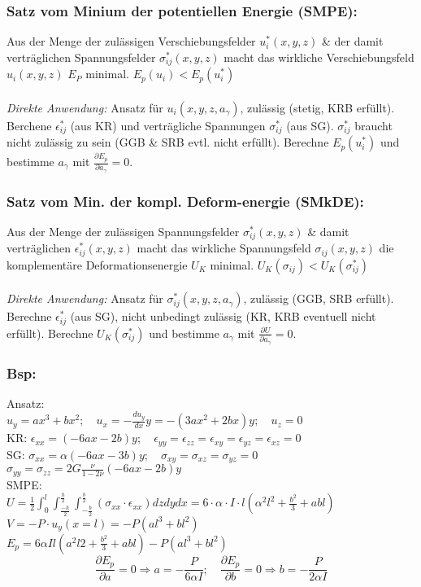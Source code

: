         \subsubsection{Satz vom Minium der potentiellen Energie (SMPE):}
            Aus der Menge der zulässigen Verschiebungsfelder $u_i^*(x,y,z)$ \& der damit verträglichen Spannungsfelder $\sigma_{ij}^*(x,y,z)$ macht das wirkliche Verschiebungsfeld $u_i(x,y,z)$ $E_P$ minimal. $E_p(u_i) < E_p(u_i^*)$\\\\
            \textit{Direkte Anwendung:} Ansatz für $u_i(x,y,z,a_\gamma)$, zulässig (stetig, KRB erfüllt). Berchene $\epsilon_{ij}^*$ (aus KR) und verträgliche Spannungen $\sigma_{ij}^*$ (aus SG). $\sigma_{ij}^*$ braucht nicht zulässig zu sein (GGB \& SRB evtl. nicht erfüllt). Berechne $E_p(u_i^*)$ und bestimme $a_\gamma$ mit $\frac{\partial E_p}{\partial a_\gamma}=0$.
            
        \subsubsection{Satz vom Min. der kompl. Deform-energie (SMkDE):}
            Aus der Menge der zulässigen Spannungsfelder $\sigma_{ij}^*(x,y,z)$ \& damit verträglichen $\epsilon_{ij}^*(x,y,z)$ macht das wirkliche Spannungsfeld $\sigma_{ij}(x,y,z)$ die komplementäre Deformationsenergie $U_K$ minimal. $U_K(\sigma_{ij}) < U_K(\sigma_{ij}^*)$\\\\
            \textit{Direkte Anwendung:} Ansatz für $\sigma_{ij}^*(x,y,z,a_\gamma)$, zulässig (GGB, SRB erfüllt). Berechne $\epsilon_{ij}^*$ (aus SG), nicht unbedingt zulässig (KR, KRB eventuell nicht erfüllt). Berechne $U_K(\sigma_{ij}^*)$ und bestimme $a_\gamma$ mit $\frac{\partial U}{\partial a_\gamma}=0$.
            
        \subsubsection{Bsp:}
            Ansatz:\\
            $u_y=ax^3+bx^2; \quad u_x=-\frac{du_y}{dx}y= -(3ax^2+2bx)y; \quad u_z = 0$\\
            KR: $\epsilon_{xx} =(-6ax-2b)y; \quad \epsilon_{yy}=\epsilon_{zz}=\epsilon_{xy}=\epsilon_{yz} = \epsilon_{xz}=0$\\
            SG: $\sigma_{xx} = \alpha(-6ax-3b)y; \quad \sigma_{xy}=\sigma_{xz}=\sigma_{yz}=0$\\ $\sigma_{yy}=\sigma_{zz}=2G\frac{\nu}{1-2\nu}(-6ax-2b)y$\\
            SMPE:\\
            $U=\frac{1}{2}\int_0^l\int_\frac{-h}{2}^\frac{h}{2}\int_{-\frac{b}{2}}^\frac{b}{2}(\sigma_{xx}\cdot\epsilon_{xx})dzdydx=6\cdot\alpha\cdot I\cdot l(\alpha^2l^2+\frac{b^2}{3}+abl)$\\
            $V=-P\cdot u_y(x=l)=-P(al^3+bl^2)$\\
            $E_p=6\alpha Il(a^2l2+\frac{b^2}{3}+abl)-P(al^3+bl^2)$
            \small\[\frac{\partial E_p}{\partial a} = 0 \Rightarrow a=-\frac{P}{6\alpha I};\quad\frac{\partial E_p}{\partial b} = 0 \Rightarrow b=-\frac{P}{2\alpha I}\]\normalsize
            
